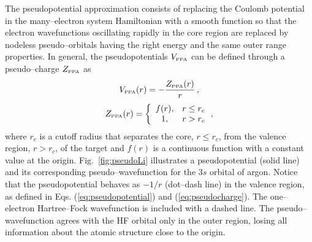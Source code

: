 \documentclass[10pt]{article}
\begin{document}
The pseudopotential approximation consists of replacing the Coulomb 
potential in the many--electron system Hamiltonian with a smooth 
function so that the electron wavefunctions oscillating rapidly in 
the core region are replaced by nodeless pseudo--orbitals having the 
right energy and the same outer range properties.
In general, the pseudopotentials $V_{\mbox{\tiny PPA}}$ can be defined 
through a pseudo--charge $Z_{\mbox{\tiny PPA}}$ as
\begin{equation}
 V_{\mbox{\tiny PPA}}(r)=-\frac{Z_{\mbox{\tiny PPA}}(r)}{r} \,,
 \label{eq:pseudopotential}
\end{equation}
\begin{equation}
 Z_{\mbox{\tiny PPA}}(r)=\bigg\{
 \begin{array}{cl}
  f(r), & r\leq r_c \\
  1, & r>r_c 
 \end{array} 
 \,,
 \label{eq:pseudocharge}
\end{equation}
where $r_c$ is a cutoff radius that separates the core, $r\leq r_c$,
from the valence region, $r>r_c$, of the target and $f(r)$ is a 
continuous function with a constant value at the origin.
Fig.~\ref{fig:pseudoLi} illustrates a pseudopotential (solid line)
and its corresponding pseudo--wavefunction for the $3s$ orbital of 
argon. Notice that the pseudopotential behaves as $-1/r$ (dot--dash 
line) in the valence region, as defined in Eqs. (\ref{eq:pseudopotential})
and (\ref{eq:pseudocharge}).
The one--electron Hartree--Fock wavefunction is included
with a dashed line. The pseudo--wavefunction agrees with the 
HF orbital only in the outer region, losing all 
information about the atomic structure close to the origin.
\end{document}
